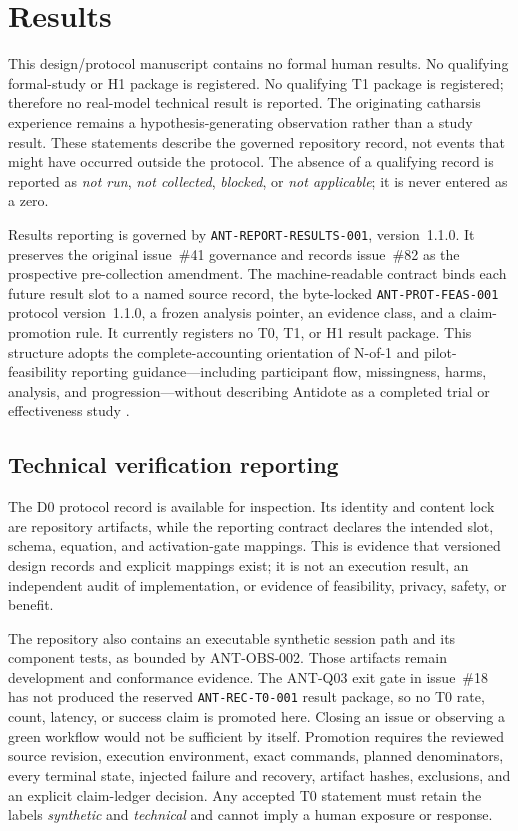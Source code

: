 \section{Results}
\label{sec:results}

This design/protocol manuscript contains no formal human results. No qualifying
formal-study or H1 package is registered. No qualifying T1 package is
registered; therefore no real-model technical result is reported. The
originating catharsis experience remains a hypothesis-generating observation
rather than a study result. These statements describe the governed repository
record, not events that might have occurred outside the protocol. The absence
of a qualifying record is reported as \emph{not run}, \emph{not collected},
\emph{blocked}, or \emph{not applicable}; it is never entered as a zero.

Results reporting is governed by \texttt{ANT-REPORT-RESULTS-001}, version~1.1.0.
It preserves the original issue~\#41 governance and records issue~\#82 as the
prospective pre-collection amendment. The machine-readable contract binds each
future result slot to a named source record, the byte-locked
\texttt{ANT-PROT-FEAS-001} protocol version~1.1.0, a frozen analysis pointer, an
evidence class, and a claim-promotion rule. It currently registers no T0, T1,
or H1 result package. This structure adopts the complete-accounting orientation
of N-of-1 and pilot-feasibility reporting guidance---including participant
flow, missingness, harms, analysis, and progression---without describing
Antidote as a completed trial or effectiveness study
\cite{vohra2015cent,eldridge2016feasibility}.

\subsection{Technical verification reporting}
\label{sec:results-technical-verification}

The D0 protocol record is available for inspection. Its identity and content
lock are repository artifacts, while the reporting contract declares the
intended slot, schema, equation, and activation-gate mappings. This is evidence
that versioned design records and explicit mappings exist; it is not an
execution result, an independent audit of implementation, or evidence of
feasibility, privacy, safety, or benefit.

The repository also contains an executable synthetic session path and its
component tests, as bounded by ANT-OBS-002. Those artifacts remain development
and conformance evidence. The ANT-Q03 exit gate in issue~\#18 has not produced
the reserved \texttt{ANT-REC-T0-001} result package, so no T0 rate, count,
latency, or success claim is promoted here. Closing an issue or observing a
green workflow would not be sufficient by itself. Promotion requires the
reviewed source revision, execution environment, exact commands, planned
denominators, every terminal state, injected failure and recovery, artifact
hashes, exclusions, and an explicit claim-ledger decision. Any accepted T0
statement must retain the labels \emph{synthetic} and \emph{technical} and
cannot imply a human exposure or response.

